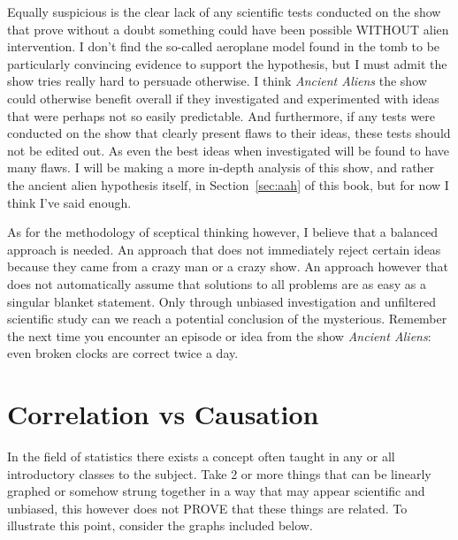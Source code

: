Equally suspicious is the clear lack of any scientific tests conducted on the show
that prove without a doubt something could have been possible WITHOUT alien
intervention. I don't find the so-called aeroplane model found in the tomb to be
particularly convincing evidence to support the hypothesis, but I must admit the
show tries really hard to persuade otherwise. I think \emph{Ancient Aliens} the show
could otherwise benefit overall if they investigated and experimented with ideas
that were perhaps not so easily predictable. And furthermore, if any tests were
conducted on the show that clearly present flaws to their ideas, these tests should
not be edited out. As even the best ideas when investigated will be found to have
many flaws. I will be making a more in-depth analysis of this show, and rather the
ancient alien hypothesis itself, in Section~\ref{sec:aah} of this book, but for now
I think I've said enough.

As for the methodology of sceptical thinking however, I believe that a balanced
approach is needed. An approach that does not immediately reject certain ideas
because they came from a crazy man or a crazy show. An approach however that does
not automatically assume that solutions to all problems are as easy as a singular
blanket statement. Only through unbiased investigation and unfiltered scientific
study can we reach a potential conclusion of the mysterious. Remember the next
time you encounter an episode or idea from the show \emph{Ancient Aliens}: even
broken clocks are correct twice a day.

\section{Correlation vs Causation}\label{sec:correlationvscausation}

In the field of statistics there exists a concept often taught in any or all
introductory classes to the subject.  Take 2 or more things
that can be linearly graphed or somehow strung together in a way that may appear
scientific and unbiased, this however does not PROVE that these things are related.
To illustrate this point, consider the graphs included below.

